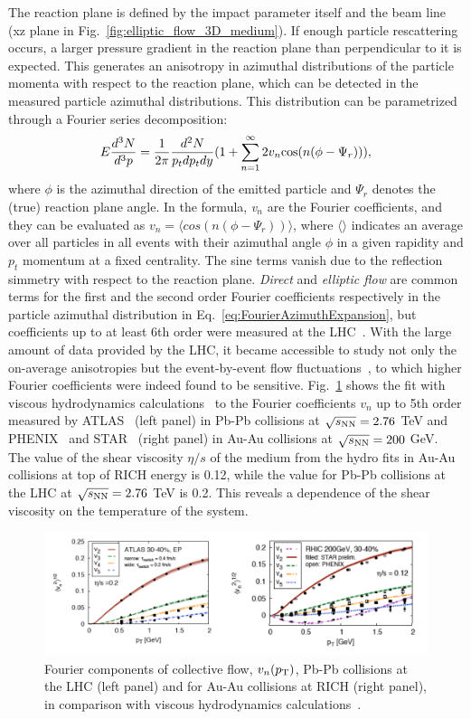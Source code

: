 The reaction plane is defined by the impact parameter itself and the beam line (xz plane in Fig.~\ref{fig:elliptic_flow_3D_medium}). If enough particle rescattering occurs, a larger pressure gradient in the reaction plane than perpendicular to it is expected. This generates an anisotropy in azimuthal distributions of the particle momenta with respect to the reaction plane, which can be detected in the measured particle azimuthal distributions. This distribution can be parametrized through a Fourier series decomposition:
\begin{equation}
\label{eq:FourierAzimuthExpansion}
E \frac{d^3N}{d^3p} = \frac{1}{2\pi} \frac{d^2N}{p_t dp_t dy} (1 + \sum_{n=1}^\infty 2v_n {\rm cos} (n(\phi - \Psi_r))),
\end{equation}
where $\phi$ is the azimuthal direction of the emitted particle and $\Psi_r$ denotes the (true) reaction plane angle.
In the formula, {\it v$_n$} are the Fourier coefficients, and they can be evaluated as $v_n = \langle cos(n(\phi - \Psi_r)) \rangle$, where $\langle \rangle$ indicates an average over all particles in all events with their azimuthal angle $\phi$ in a given rapidity and $p_t$ momentum at a fixed centrality. The sine terms vanish due to the reflection simmetry with respect to the reaction plane. {\it Direct} and {\it elliptic flow} are common terms for the first and the
second order Fourier coefficients respectively in the particle azimuthal distribution in Eq.~\ref{eq:FourierAzimuthExpansion}, but coefficients up to at least 6th order were measured at the LHC~\cite{ATLAS:2012at}. With the large amount of data provided by the LHC, it became accessible to study not only the on-average anisotropies but the event-by-event flow fluctuations~\cite{Aad:2013xma,Schukraft:2012ah}, to which higher Fourier coefficients were indeed found to be sensitive. Fig.~\ref{fig:vnHydro} shows the fit with viscous hydrodynamics calculations~\cite{Gale:2012rq} to the Fourier coefficients $v_n$ up to 5th order measured by ATLAS~\cite{ATLAS:2012at} (left panel) in Pb-Pb collisions at $\sqrt{s_{\rm NN}} = 2.76$ TeV and PHENIX~\cite{Adare:2011tg} and STAR~\cite{Pandit:2012mq} (right panel) in Au-Au collisions at $\sqrt{s_{\rm NN}} = 200 $ GeV. The value of the shear viscosity $\eta/s$ of the medium from the hydro fits in Au-Au collisions at top of RICH energy is 0.12, while the value for Pb-Pb collisions at the LHC at $\sqrt{s_{\rm NN}} = 2.76$ TeV is 0.2. This reveals a dependence of the shear viscosity on the temperature of the system.
\begin{figure}[!ht]
  \centering
  \includegraphics[width=15cm]{FigCap1/RICH_ATLAS_vn.png}
  \caption{Fourier components of collective flow, $v_n(p_{\rm T})$, Pb-Pb collisions at the LHC (left panel) and for Au-Au collisions at RICH (right panel), in comparison with viscous hydrodynamics calculations~\cite{Gale:2012rq}.}
  \label{fig:vnHydro}
\end{figure}
